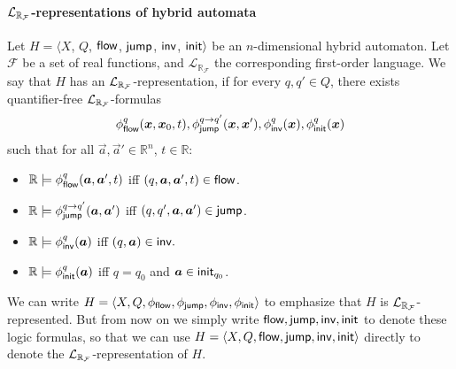 \paragraph{$\mathcal{L}_{\mathbb{R}_{\mathcal{F}}}$-representations of hybrid automata}
Let $H = \langle X$, $Q$, $\mathsf{flow}$, $\mathsf{jump}$, $\mathsf{inv}$, $\mathsf{init}\rangle$ be an $n$-dimensional hybrid automaton.  Let $\mathcal{F}$
be a set of real functions, and $\mathcal{L}_{\mathbb{R}_{\mathcal{F}}}$ the corresponding first-order language. We say that $H$ has an $\mathcal{L}_{\mathbb{R}_{\mathcal{F}}}$-representation, if for every $q,q'\in Q$, there exists  quantifier-free
$\mathcal{L}_{\mathbb{R}_{\mathcal{F}}}$-formulas $$\phi^q_{\flow}(\vec x, \vec x_0, t), \phi^{q\rightarrow
q'}_{\jump}(\vec x,
\vec x'), \phi^{q}_{\inv}(\vec x), \phi^q_{\init}(\vec x)$$
such that for all
$\vec a ,\vec a'\in \mathbb{R}^n$,
$t\in\mathbb{R}$:
\begin{itemize}
\item $\mathbb{R}\models \phi^q_{\flow}(\vec a, \vec a', t)$ iff $(q, \vec
a,
\vec a', t)\in \flow$.
\item $\mathbb{R}\models \phi^{q\rightarrow q'}_{\jump}(\vec a, \vec a')$ iff
$(q, q', \vec a, \vec a')\in \jump$.
\item $\mathbb{R}\models \phi^q_{\inv}(\vec a)$ iff $(q, \vec a)\in \inv.$
\item $\mathbb{R}\models \phi^q_{\init}(\vec a)$ iff $q = q_0$ and $\vec a\in
\init_{q_0}$.
\end{itemize}
We can write $H = \langle X, Q, \phi_{\mathsf{flow}}, \phi_{\mathsf{jump}}, \phi_{\mathsf{inv}},\phi_{\mathsf{init}}\rangle$ to emphasize that $H$ is $\mathcal{L}_{\mathbb{R}_{\mathcal{F}}}$-represented. But from now on we simply write $\mathsf{flow}, \mathsf{jump}, \mathsf{inv}, \mathsf{init}$ to denote these logic formulas, so that we can use $H = \langle X, Q, \mathsf{flow}, \mathsf{jump}, \mathsf{inv}, \mathsf{init}\rangle$ directly to denote the $\mathcal{L}_{\mathbb{R}_{\mathcal{F}}}$-representation of $H$.

